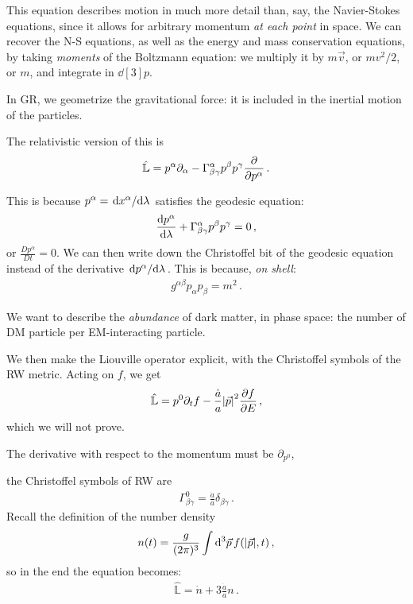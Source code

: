 \documentclass[main.tex]{subfiles}
\begin{document}
This equation describes motion in much more detail than, say, the Navier-Stokes equations, since it allows for arbitrary momentum \emph{at each point} in space. 
We can recover the N-S equations, as well as the energy and mass conservation equations, by taking \emph{moments} of the Boltzmann equation: we multiply it by \(m \vec{v}\), or \(m v^2 / 2\), or \(m\), and integrate in \(\dd[3]{p}\).

In GR, we geometrize the gravitational force: it is included in the inertial motion of the particles. 

The relativistic version of this is 
%
\begin{align}
  \hat{\mathbb{L}} = p^{\alpha } \partial_{\alpha } - \Gamma^{\alpha }_{\beta \gamma } p^{\beta } p^{\gamma } \pdv{}{p^{\alpha }}
\,.
\end{align}
%

This is because \(p^{\alpha } = \dv*{x^{\alpha }}{\lambda }\) satisfies the geodesic equation: 
%
\begin{align}
  \dv{p^{\alpha }}{\lambda } + \Gamma^{\alpha }_{\beta \gamma } p^{\beta } p^{\gamma }=0
\,,
\end{align}
%
or \(\frac{Dp^{\alpha }}{Dt } =0\). We can then write down the Christoffel bit of the geodesic equation instead of the derivative \(\dv*{p^{\alpha }}{\lambda }\). This is because, \emph{on shell}: 
%
\begin{align}
  g^{\alpha \beta } p_{\alpha } p_{\beta } = m^2
\,. 
\end{align}

We want to describe the \emph{abundance} of dark matter, in phase space: the number of DM particle per EM-interacting particle. 

We then make the Liouville operator explicit, with the Christoffel symbols of the RW metric. Acting on \(f\), we get 
%
\begin{align}
  \hat{\mathbb{L}}  = p^{0} \partial_t f - \frac{\dot{a}}{a} \abs{\vec{p}}^2 \pdv{f}{E}
\,,
\end{align}
%
which we will not prove. 

The derivative with respect to the momentum must be \(\partial_{p^{0}}\),


the Christoffel symbols of RW are 
%
\begin{align}
  \Gamma^{0}_{\beta \gamma } = \frac{\dot{a}}{a} \delta_{\beta \gamma }
\,.
\end{align}
%
Recall the definition of the number density 
%
\begin{align}
  n(t) = \frac{g}{(2\pi )^3} \int  \dd[3]{\vec{p}} f(\abs{\vec{p}}, t) 
\,,
\end{align}
%
so in the end the equation becomes: 
%
\begin{align}
  \hat{\mathbb{L}} = \dot{n} + 3 \frac{\dot{a}}{a} n 
\,. 
\end{align}
%
\end{document}
